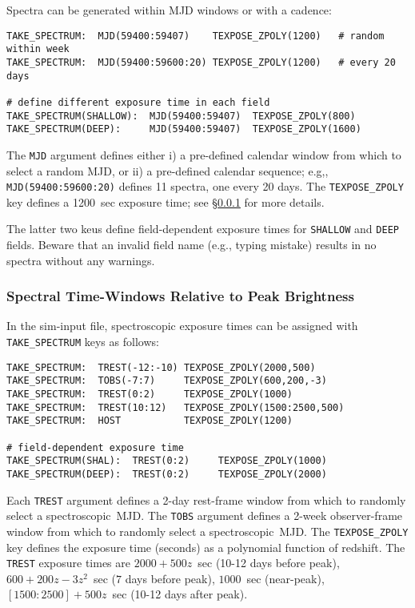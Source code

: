 \documentclass[12pt]{article}
\newcommand{\spec}{spectroscopic}
\begin{document}
Spectra can be generated within MJD windows or with a cadence:
%
\begin{Verbatim}[frame=single]
TAKE_SPECTRUM:  MJD(59400:59407)    TEXPOSE_ZPOLY(1200)   # random within week
TAKE_SPECTRUM:  MJD(59400:59600:20) TEXPOSE_ZPOLY(1200)   # every 20 days

# define different exposure time in each field
TAKE_SPECTRUM(SHALLOW):  MJD(59400:59407)  TEXPOSE_ZPOLY(800) 
TAKE_SPECTRUM(DEEP):     MJD(59400:59407)  TEXPOSE_ZPOLY(1600) 
\end{Verbatim}
%
The {\tt MJD} argument defines either 
i) a pre-defined calendar window from which to select a random MJD, 
or 
ii) a pre-defined calendar sequence;
e.g,, {\tt MJD(59400:59600:20)} defines 11 spectra, one every 20 days.
The {\tt TEXPOSE\_ZPOLY} key defines a 1200~sec exposure time;
see \S\ref{sss:SPEC_EPOCH} for more details.

The latter two keus define field-dependent exposure times for
{\tt SHALLOW} and {\tt DEEP} fields. Beware that an invalid
field name (e.g., typing mistake) results in no spectra without 
any warnings.


\subsubsection{Spectral Time-Windows Relative to Peak Brightness }
\label{sss:SPEC_EPOCH}

In the sim-input file, spectroscopic exposure times 
can be assigned with {\tt TAKE\_SPECTRUM} keys as follows:
%
\begin{Verbatim}[frame=single]
TAKE_SPECTRUM:  TREST(-12:-10) TEXPOSE_ZPOLY(2000,500)
TAKE_SPECTRUM:  TOBS(-7:7)     TEXPOSE_ZPOLY(600,200,-3)
TAKE_SPECTRUM:  TREST(0:2)     TEXPOSE_ZPOLY(1000) 
TAKE_SPECTRUM:  TREST(10:12)   TEXPOSE_ZPOLY(1500:2500,500)
TAKE_SPECTRUM:  HOST           TEXPOSE_ZPOLY(1200) 

# field-dependent exposure time
TAKE_SPECTRUM(SHAL):  TREST(0:2)     TEXPOSE_ZPOLY(1000) 
TAKE_SPECTRUM(DEEP):  TREST(0:2)     TEXPOSE_ZPOLY(2000) 
\end{Verbatim}
%
Each {\tt TREST} argument defines a 2-day rest-frame window from 
which to randomly select a \spec\ MJD.
The {\tt TOBS} argument defines a 2-week observer-frame window 
from which to randomly select a \spec\ MJD.
The {\tt TEXPOSE\_ZPOLY} key defines the exposure time (seconds) 
as a polynomial function of redshift. 
The {\tt TREST} exposure times are 
$2000+500z$~sec (10-12 days before peak),
$600+200z-3z^2$~sec ($7$ days before peak),
$1000$~sec (near-peak),
$[1500:2500]+500z$~sec (10-12 days after peak).
\end{document}

